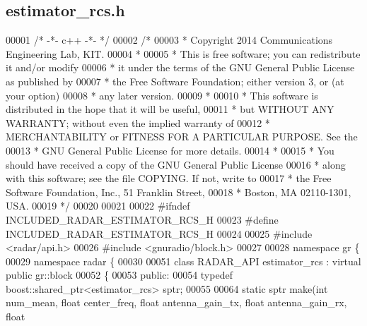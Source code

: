 \subsection{estimator\+\_\+rcs.\+h}
\label{estimator__rcs_8h_source}

\begin{DoxyCode}
00001 \textcolor{comment}{/* -*- c++ -*- */}
00002 \textcolor{comment}{/* }
00003 \textcolor{comment}{ * Copyright 2014 Communications Engineering Lab, KIT.}
00004 \textcolor{comment}{ * }
00005 \textcolor{comment}{ * This is free software; you can redistribute it and/or modify}
00006 \textcolor{comment}{ * it under the terms of the GNU General Public License as published by}
00007 \textcolor{comment}{ * the Free Software Foundation; either version 3, or (at your option)}
00008 \textcolor{comment}{ * any later version.}
00009 \textcolor{comment}{ * }
00010 \textcolor{comment}{ * This software is distributed in the hope that it will be useful,}
00011 \textcolor{comment}{ * but WITHOUT ANY WARRANTY; without even the implied warranty of}
00012 \textcolor{comment}{ * MERCHANTABILITY or FITNESS FOR A PARTICULAR PURPOSE.  See the}
00013 \textcolor{comment}{ * GNU General Public License for more details.}
00014 \textcolor{comment}{ * }
00015 \textcolor{comment}{ * You should have received a copy of the GNU General Public License}
00016 \textcolor{comment}{ * along with this software; see the file COPYING.  If not, write to}
00017 \textcolor{comment}{ * the Free Software Foundation, Inc., 51 Franklin Street,}
00018 \textcolor{comment}{ * Boston, MA 02110-1301, USA.}
00019 \textcolor{comment}{ */}
00020 
00021 
00022 \textcolor{preprocessor}{#ifndef INCLUDED\_RADAR\_ESTIMATOR\_RCS\_H}
00023 \textcolor{preprocessor}{#define INCLUDED\_RADAR\_ESTIMATOR\_RCS\_H}
00024 
00025 \textcolor{preprocessor}{#include <radar/api.h>}
00026 \textcolor{preprocessor}{#include <gnuradio/block.h>}
00027 
00028 \textcolor{keyword}{namespace }gr \{
00029   \textcolor{keyword}{namespace }radar \{
00030 
00051     \textcolor{keyword}{class }RADAR_API estimator_rcs : \textcolor{keyword}{virtual} \textcolor{keyword}{public} gr::block
00052     \{
00053      \textcolor{keyword}{public}:
00054       \textcolor{keyword}{typedef} boost::shared\_ptr<estimator\_rcs> sptr;
00055 
00064       \textcolor{keyword}{static} sptr make(\textcolor{keywordtype}{int} num\_mean, \textcolor{keywordtype}{float} center_freq, \textcolor{keywordtype}{float} antenna\_gain\_tx, \textcolor{keywordtype}{float} antenna\_gain\_rx, \textcolor{keywordtype}{float}

\end{DoxyCode}

